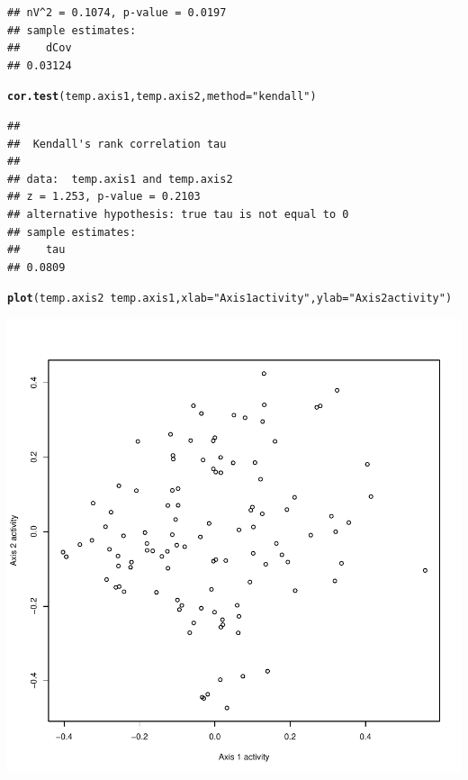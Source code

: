 \documentclass{article}\usepackage[]{graphicx}\usepackage[]{color}
\makeatletter
\def\maxwidth{ %
  \ifdim\Gin@nat@width>\linewidth
    \linewidth
  \else
    \Gin@nat@width
  \fi
}
\newcommand{\hlstr}[1]{\textcolor[rgb]{0.192,0.494,0.8}{#1}}%
\newcommand{\hlopt}[1]{\textcolor[rgb]{0,0,0}{#1}}%
\newcommand{\hlstd}[1]{\textcolor[rgb]{0.345,0.345,0.345}{#1}}%
\newcommand{\hlkwc}[1]{\textcolor[rgb]{0.333,0.667,0.333}{#1}}%
\newcommand{\hlkwd}[1]{\textcolor[rgb]{0.737,0.353,0.396}{\textbf{#1}}}%
\newenvironment{kframe}{%
 \def\at@end@of@kframe{}%
 \ifinner\ifhmode%
  \def\at@end@of@kframe{\end{minipage}}%
  \begin{minipage}{\columnwidth}%
 \fi\fi%
 \def\FrameCommand##1{\hskip\@totalleftmargin \hskip-\fboxsep
 \colorbox{shadecolor}{##1}\hskip-\fboxsep
     \hskip-\linewidth \hskip-\@totalleftmargin \hskip\columnwidth}%
 \MakeFramed {\advance\hsize-\width
   \@totalleftmargin\z@ \linewidth\hsize
   \@setminipage}}%
 {\par\unskip\endMakeFramed%
 \at@end@of@kframe}
\newenvironment{knitrout}{}{} %
\makeatother
\begin{document}
\begin{knitrout}
\begin{kframe}
\begin{verbatim}
## nV^2 = 0.1074, p-value = 0.0197
## sample estimates:
##    dCov 
## 0.03124
\end{verbatim}
\begin{alltt}
\hlkwd{cor.test}\hlstd{(temp.axis1, temp.axis2,} \hlkwc{method} \hlstd{=} \hlstr{"kendall"}\hlstd{)}
\end{alltt}
\begin{verbatim}
## 
## 	Kendall's rank correlation tau
## 
## data:  temp.axis1 and temp.axis2
## z = 1.253, p-value = 0.2103
## alternative hypothesis: true tau is not equal to 0
## sample estimates:
##    tau 
## 0.0809
\end{verbatim}
\begin{alltt}
\hlkwd{plot}\hlstd{(temp.axis2} \hlopt{~} \hlstd{temp.axis1,} \hlkwc{xlab} \hlstd{=} \hlstr{"Axis 1 activity"}\hlstd{,} \hlkwc{ylab} \hlstd{=} \hlstr{"Axis 2 activity"}\hlstd{)}
\end{alltt}
\end{kframe}

{\centering \includegraphics[width=\maxwidth]{figure/metagene-pairs-10} 

}



\end{knitrout}
\end{document}
